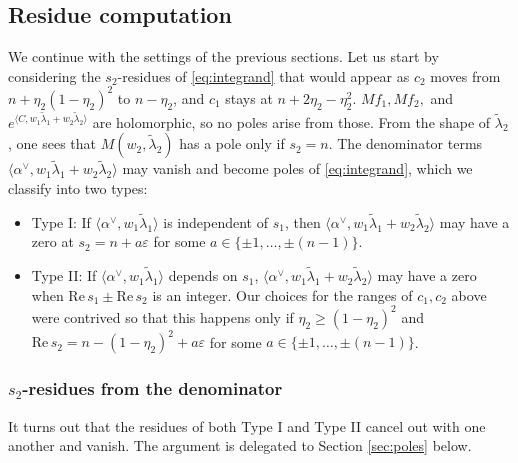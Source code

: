 \documentclass[11pt]{amsart}
\numberwithin{theorem}{section}
\numberwithin{equation}{section}
\theoremstyle{remark}
\theoremstyle{definition}
\newcommand{\re}{\mathrm{Re}\,}
\begin{document}
\subsection{Residue computation} \label{sec:residue}

We continue with the settings of the previous sections. Let us start by considering the $s_2$-residues of \eqref{eq:integrand} that would appear as $c_2$ moves from $n+\eta_2(1-\eta_2)^2$ to $n-\eta_2$, and $c_1$ stays at $n+2\eta_2-\eta_2^2$. $Mf_1,Mf_2,$ and $e^{\langle C,w_1\tilde\lambda_1+w_2\tilde\lambda_2\rangle}$ are holomorphic, so no poles arise from those. From the shape of $\tilde\lambda_2$, one sees that $M(w_2,\tilde\lambda_2)$ has a pole only if $s_2=n$. The denominator terms $\langle \alpha^\vee,w_1\tilde\lambda_1+w_2\tilde\lambda_2\rangle$ may vanish and become poles of \eqref{eq:integrand}, which we classify into two types:
\begin{itemize}
\item Type I: If $\langle \alpha^\vee,w_1\tilde\lambda_1\rangle$ is independent of $s_1$, then $\langle \alpha^\vee,w_1\tilde\lambda_1+w_2\tilde\lambda_2\rangle$ may have a zero at $s_2=n+a\varepsilon$ for some $a \in \{\pm1,\ldots,\pm(n-1)\}$.

\item Type II: If $\langle \alpha^\vee,w_1\tilde\lambda_1\rangle$ depends on $s_1$, $\langle \alpha^\vee,w_1\tilde\lambda_1+w_2\tilde\lambda_2\rangle$ may have a zero when $\re s_1 \pm \re s_2$ is an integer. Our choices for the ranges of $c_1,c_2$ above were contrived so that this happens only if $\eta_2 \geq (1-\eta_2)^2$ and $\re s_2 = n-(1-\eta_2)^2 +a\varepsilon$ for some $a \in \{\pm1,\ldots,\pm(n-1)\}$.
\end{itemize}



\subsubsection*{$s_2$-residues from the denominator}

It turns out that the residues of both Type I and Type II cancel out with one another and vanish. The argument is delegated to Section \ref{sec:poles} below.
\end{document}
